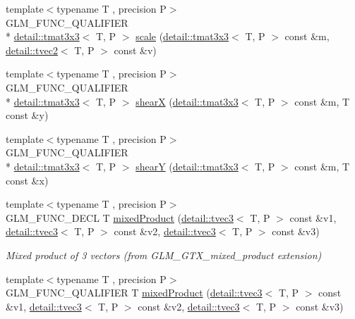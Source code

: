\begin{DoxyCompactItemize}
{\footnotesize template$<$typename T , precision P$>$ }\\G\-L\-M\-\_\-\-F\-U\-N\-C\-\_\-\-Q\-U\-A\-L\-I\-F\-I\-E\-R \\*
\hyperlink{structglm_1_1detail_1_1tmat3x3}{detail\-::tmat3x3}$<$ T, P $>$ \hyperlink{group__gtx__matrix__transform__2d_gaf17588e16120250980b221c2ebdde0eb}{scale} (\hyperlink{structglm_1_1detail_1_1tmat3x3}{detail\-::tmat3x3}$<$ T, P $>$ const \&m, \hyperlink{structglm_1_1detail_1_1tvec2}{detail\-::tvec2}$<$ T, P $>$ const \&v)
\item 
{\footnotesize template$<$typename T , precision P$>$ }\\G\-L\-M\-\_\-\-F\-U\-N\-C\-\_\-\-Q\-U\-A\-L\-I\-F\-I\-E\-R \\*
\hyperlink{structglm_1_1detail_1_1tmat3x3}{detail\-::tmat3x3}$<$ T, P $>$ \hyperlink{group__gtx__matrix__transform__2d_gaeac73f42bba3e35100d9a43c40dc0f23}{shear\-X} (\hyperlink{structglm_1_1detail_1_1tmat3x3}{detail\-::tmat3x3}$<$ T, P $>$ const \&m, T const \&y)
\item 
{\footnotesize template$<$typename T , precision P$>$ }\\G\-L\-M\-\_\-\-F\-U\-N\-C\-\_\-\-Q\-U\-A\-L\-I\-F\-I\-E\-R \\*
\hyperlink{structglm_1_1detail_1_1tmat3x3}{detail\-::tmat3x3}$<$ T, P $>$ \hyperlink{group__gtx__matrix__transform__2d_ga04dd04815c1c8ee0bd49e6ae499d8252}{shear\-Y} (\hyperlink{structglm_1_1detail_1_1tmat3x3}{detail\-::tmat3x3}$<$ T, P $>$ const \&m, T const \&x)
\item 
\hypertarget{group__gtx__mixed__product_ga3c7ec94fdd2b088eac78fb4a0211f32d}{{\footnotesize template$<$typename T , precision P$>$ }\\G\-L\-M\-\_\-\-F\-U\-N\-C\-\_\-\-D\-E\-C\-L T \hyperlink{group__gtx__mixed__product_ga3c7ec94fdd2b088eac78fb4a0211f32d}{mixed\-Product} (\hyperlink{structglm_1_1detail_1_1tvec3}{detail\-::tvec3}$<$ T, P $>$ const \&v1, \hyperlink{structglm_1_1detail_1_1tvec3}{detail\-::tvec3}$<$ T, P $>$ const \&v2, \hyperlink{structglm_1_1detail_1_1tvec3}{detail\-::tvec3}$<$ T, P $>$ const \&v3)}\label{group__gtx__mixed__product_ga3c7ec94fdd2b088eac78fb4a0211f32d}

\begin{DoxyCompactList}\small\item\em Mixed product of 3 vectors (from G\-L\-M\-\_\-\-G\-T\-X\-\_\-mixed\-\_\-product extension) \end{DoxyCompactList}\item 
\hypertarget{group__gtx__mixed__product_ga3c7ec94fdd2b088eac78fb4a0211f32d}{{\footnotesize template$<$typename T , precision P$>$ }\\G\-L\-M\-\_\-\-F\-U\-N\-C\-\_\-\-Q\-U\-A\-L\-I\-F\-I\-E\-R T \hyperlink{group__gtx__mixed__product_ga3c7ec94fdd2b088eac78fb4a0211f32d}{mixed\-Product} (\hyperlink{structglm_1_1detail_1_1tvec3}{detail\-::tvec3}$<$ T, P $>$ const \&v1, \hyperlink{structglm_1_1detail_1_1tvec3}{detail\-::tvec3}$<$ T, P $>$ const \&v2, \hyperlink{structglm_1_1detail_1_1tvec3}{detail\-::tvec3}$<$ T, P $>$ const \&v3)}\label{group__gtx__mixed__product_ga3c7ec94fdd2b088eac78fb4a0211f32d}


\end{DoxyCompactItemize}
